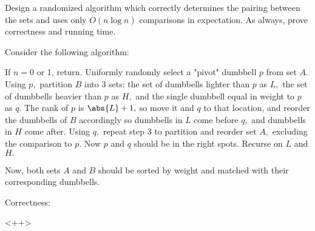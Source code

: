 \documentclass{article}
\begin{document}
Design a randomized algorithm which correctly determines the pairing between the sets and uses only $O(n \log n)$ comparisons in expectation.  As always, prove correctness and running time.
\begin{soln}
	Consider the following algorithm:
	\begin{enumerate}
		\ii If $n=0$ or 1, return.
		\ii Uniformly randomly select a "pivot" dumbbell $p$ from set $A.$
		\ii Using $p,$ partition $B$ into 3 sets: the set of dumbbells lighter than $p$ as $L,$ the set of dumbbells heavier than $p$ as $H,$ and the single dumbbell equal in weight to $p$ as $q.$ The rank of $p$ is $\abs{L}+1,$ so move it and $q$ to that location, and reorder the dumbbells of $B$ accordingly so dumbbells in $L$ come before $q,$ and dumbbells in $H$ come after.
		\ii Using $q,$ repeat step 3 to partition and reorder set $A,$ excluding the comparison to $p.$ Now $p$ and $q$ should be in the right spots.
		\ii Recurse on $L$ and $H.$
	\end{enumerate}
	Now, both sets $A$ and $B$ should be sorted by weight and matched with their corresponding dumbbells. 

	Correctness:
	\begin{subproof}
		
	\end{subproof}<++>


\end{soln}
\end{document}
